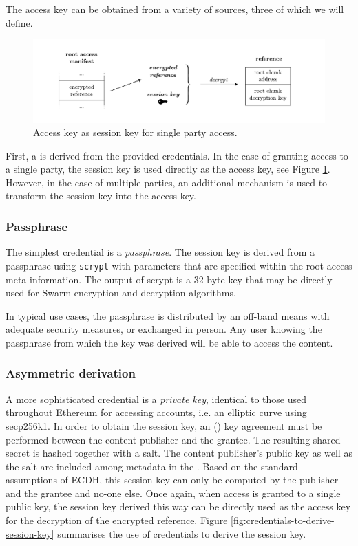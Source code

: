 The access key can be obtained from a variety of sources, three of which we will define.

\begin{figure}[htbp]
\centering
\includegraphics[width=\textwidth]{fig/access-control-single-party.pdf}
\caption[Access key as session key for single party access  \statusyellow]{Access key as session key for single party access.}
\label{fig:access-control-single-party}
\end{figure}

First, a  is derived from the provided credentials. In the case of granting access to a single party, the session key is used directly as the access key, see Figure \ref{fig:access-control-single-party}. However, in the case of multiple parties, an additional mechanism is used to transform the session key into the access key.

\subsubsection{Passphrase}
The simplest credential is a \emph{passphrase}. The session key is derived from a passphrase using \lstinline{scrypt} with parameters that are specified within the root access meta-information. The output of scrypt is a 32-byte key that may be directly used for Swarm encryption and decryption algorithms.

In typical use cases, the passphrase is distributed by an off-band means with adequate security measures, or exchanged in person. Any user knowing the passphrase from which the key was derived will be able to access the content.

\subsubsection{Asymmetric derivation}

A more sophisticated credential is a \emph{private key}, identical to those used throughout Ethereum for accessing accounts, i.e. an  elliptic curve using secp256k1. In order to obtain the session key, an  () key agreement must be performed between the content publisher and the grantee. The resulting shared secret is hashed together with a salt. The content publisher's public key as well as the salt are included among metadata in the . Based on the standard assumptions of ECDH, this session key can only be computed by the publisher and the grantee and no-one else. 
Once again, when access is granted to a single public key, the session key derived this way can be directly used as the access key for the decryption of the encrypted reference. 
Figure \ref{fig:credentials-to-derive-session-key} summarises the use of credentials to derive the session key.

